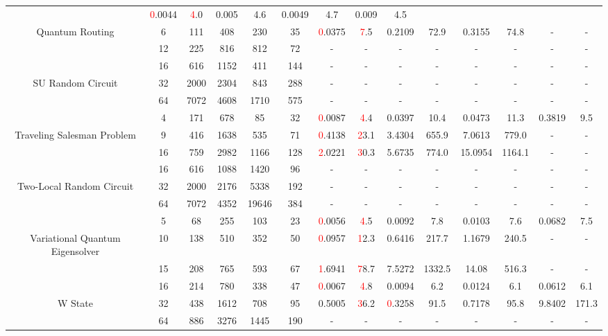 \begin{table}[htb]
{\begin{tabular}{|c|c|c|c|c|c|c|c|c|c|c|c|c|c|}
 & \textcolor{red}0.0044 & \textcolor{red}4.0
 & 0.005 & 4.6
 & 0.0049 & 4.7
 & 0.009 & 4.5
 \\
Quantum Routing & 
6 & 111 & 408 & 230 & 35
 & \textcolor{red}0.0375 & \textcolor{red}7.5
 & 0.2109 & 72.9
 & 0.3155 & 74.8
 & - & -
 \\
 & 
12 & 225 & 816 & 812 & 72
 & - & -
 & - & -
 & - & -
 & - & -
 \\
\hline
 & 
16 & 616 & 1152 & 411 & 144
 & - & -
 & - & -
 & - & -
 & - & -
 \\
SU Random Circuit & 
32 & 2000 & 2304 & 843 & 288
 & - & -
 & - & -
 & - & -
 & - & -
 \\
 & 
64 & 7072 & 4608 & 1710 & 575
 & - & -
 & - & -
 & - & -
 & - & -
 \\
\hline
 & 
4 & 171 & 678 & 85 & 32
 & \textcolor{red}0.0087 & \textcolor{red}4.4
 & 0.0397 & 10.4
 & 0.0473 & 11.3
 & 0.3819 & 9.5
 \\
Traveling Salesman Problem & 
9 & 416 & 1638 & 535 & 71
 & \textcolor{red}0.4138 & \textcolor{red}23.1
 & 3.4304 & 655.9
 & 7.0613 & 779.0
 & - & -
 \\
 & 
16 & 759 & 2982 & 1166 & 128
 & \textcolor{red}2.0221 & \textcolor{red}30.3
 & 5.6735 & 774.0
 & 15.0954 & 1164.1
 & - & -
 \\
\hline
 & 
16 & 616 & 1088 & 1420 & 96
 & - & -
 & - & -
 & - & -
 & - & -
 \\
Two-Local Random Circuit & 
32 & 2000 & 2176 & 5338 & 192
 & - & -
 & - & -
 & - & -
 & - & -
 \\
 & 
64 & 7072 & 4352 & 19646 & 384
 & - & -
 & - & -
 & - & -
 & - & -
 \\
\hline
 & 
5 & 68 & 255 & 103 & 23
 & \textcolor{red}0.0056 & \textcolor{red}4.5
 & 0.0092 & 7.8
 & 0.0103 & 7.6
 & 0.0682 & 7.5
 \\
Variational Quantum Eigensolver & 
10 & 138 & 510 & 352 & 50
 & \textcolor{red}0.0957 & \textcolor{red}12.3
 & 0.6416 & 217.7
 & 1.1679 & 240.5
 & - & -
 \\
 & 
15 & 208 & 765 & 593 & 67
 & \textcolor{red}1.6941 & \textcolor{red}78.7
 & 7.5272 & 1332.5
 & 14.08 & 516.3
 & - & -
 \\
\hline
 & 
16 & 214 & 780 & 338 & 47
 & \textcolor{red}0.0067 & \textcolor{red}4.8
 & 0.0094 & 6.2
 & 0.0124 & 6.1
 & 0.0612 & 6.1
 \\
W State & 
32 & 438 & 1612 & 708 & 95
 & 0.5005 & \textcolor{red}36.2
 & \textcolor{red}0.3258 & 91.5
 & 0.7178 & 95.8
 & 9.8402 & 171.3
 \\
 & 
64 & 886 & 3276 & 1445 & 190
 & - & -
 & - & -
 & - & -
 & - & -
 \\
\hline
\end{tabular}}
\end{table}